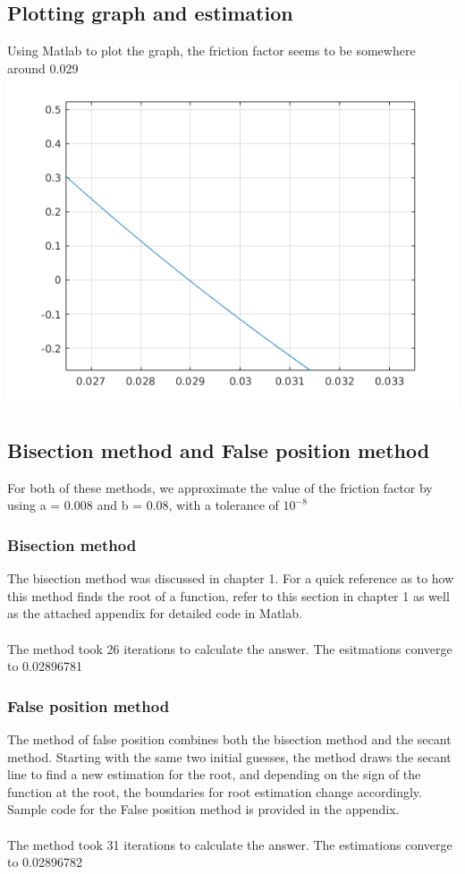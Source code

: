 \documentclass{book}
\begin{document}
    \subsection{Plotting graph and estimation}
    Using Matlab to plot the graph, the friction factor seems to be somewhere around 0.029 \\
    \includegraphics[scale=0.6]{untitled.png}
    
    \subsection{Bisection method and False position method}
    For both of these methods, we approximate the value of the friction factor by using a = 0.008 and b = 0.08, with a tolerance of ${10^{-8}}$
    \subsubsection{Bisection method}
    The bisection method was discussed in chapter 1. For a quick reference as to how this method finds the root of a function, refer to this section in chapter 1 as well as the attached appendix for detailed code in Matlab.\\
    \\
    The method took 26 iterations to calculate the answer. The esitmations converge to 0.02896781 
    \subsubsection{False position method}
    The method of false position combines both the bisection method and the secant method. Starting with the same two initial guesses, the method draws the secant line to find a new estimation for the root, and depending on the sign of the function at the root, the boundaries for root estimation change accordingly. Sample code for the False position method is provided in the appendix. \\
    \\
    The method took 31 iterations to calculate the answer. The estimations converge to 0.02896782
\end{document}
